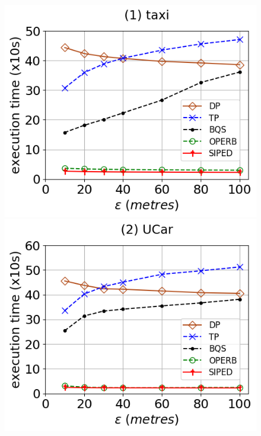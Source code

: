 \begin{figure}[tb!]
	\centering
	\includegraphics[scale=0.315]{Figures/Exp-PED-time-epsilon-taxi.png}	\hspace{1ex}
	\includegraphics[scale=0.315]{Figures/Exp-PED-time-epsilon-service.png}	\hspace{1ex}

\end{figure}
